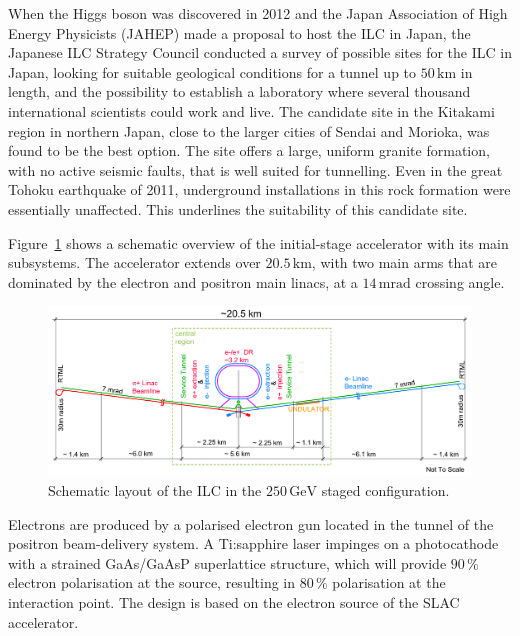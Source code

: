 \documentclass[%
 reprint,
 amsmath,amssymb,
 aps,
]{revtex4-1}
\begin{document}
When the Higgs boson was discovered in 2012 and the Japan
 Association of High Energy Physicists (JAHEP) made a proposal to host the ILC in Japan,
the Japanese ILC Strategy Council conducted a survey of possible sites
for the ILC in Japan, looking for  suitable geological conditions
 for a tunnel up to $50\,{\mathrm{km}}$ in length, and the possibility to establish a
 laboratory where several thousand international scientists could  work and live. 
The candidate site in the Kitakami region in
 northern Japan, close to the larger cities of Sendai and Morioka, 
was found to be the best option. 
The site offers a large, uniform granite formation, 
with no active seismic faults, that is well suited for tunnelling.
Even in the great Tohoku earthquake of 2011,  underground installations
in this rock formation were essentially unaffected. This  underlines
 the suitability of this candidate site. 

Figure~\ref{fig_ilc-schematic} shows a schematic overview of the
initial-stage 
accelerator with its main subsystems.
The accelerator extends over $20.5\,{\mathrm{km}}$, with two main arms that are dominated by the electron and positron main linacs, at a $14\,{\mathrm{mrad}}$ crossing angle.

 \begin{figure}[tb]
 \begin{center}
 \includegraphics[width=\hsize]{figures/TDR-machine-layout-cartoon-staged-mirror.pdf}
\caption{Schematic layout of the ILC
 in the $250\,{\mathrm{GeV}}$ staged configuration.
\label{fig_ilc-schematic}}
 \end{center}
 \vspace{-0.7cm}
 \end{figure}

Electrons are produced by a polarised electron gun located in the
tunnel of the positron beam-delivery system. A Ti:sapphire laser
impinges on a photocathode with a strained GaAs/GaAsP superlattice
structure, which will provide  $90\,\%$ electron polarisation at the
source, resulting in $80\,\%$ polarisation at the interaction
point. The design is based on the electron source of the SLAC
 accelerator. 
\end{document}
